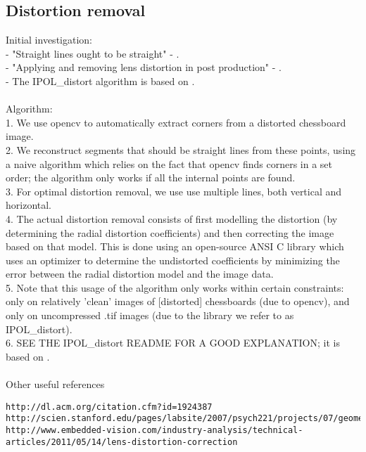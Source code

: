 \subsection{Distortion removal}
Initial investigation:\\
- "Straight lines ought to be straight" - \cite{straightlines} .\\
- "Applying and removing lens distortion in post production" - \cite{postproduction} .\\
- The IPOL_distort algorithm is based on \cite{algebraic-distortion} .\\\\
Algorithm:\\
1. We use opencv to automatically extract corners from a distorted chessboard image.\\
2. We reconstruct segments that should be straight lines from these points, using a naive algorithm which relies on the fact that opencv finds corners in a set order; the algorithm only works if all the internal points are found.\\
3. For optimal distortion removal, we use use multiple lines, both vertical and horizontal.\\
4. The actual distortion removal consists of first modelling the distortion (by determining the radial distortion coefficients) and then correcting the image based on that model. This is done using an open-source ANSI C library which uses an optimizer to determine the undistorted coefficients by minimizing the error between the radial distortion model and the image data.\\
5. Note that this usage of the algorithm only works within certain constraints: only on relatively 'clean' images of [distorted] chessboards (due to opencv), and only on uncompressed .tif images (due to the library we refer to as IPOL_distort).\\
6. SEE THE IPOL_distort README FOR A GOOD EXPLANATION; it is based on \cite{algebraic-distortion}.\\\\
Other useful references\\
\begin{verbatim}
http://dl.acm.org/citation.cfm?id=1924387
http://scien.stanford.edu/pages/labsite/2007/psych221/projects/07/geometric_distortion/project.htm
http://www.embedded-vision.com/industry-analysis/technical-articles/2011/05/14/lens-distortion-correction
\end{verbatim}
